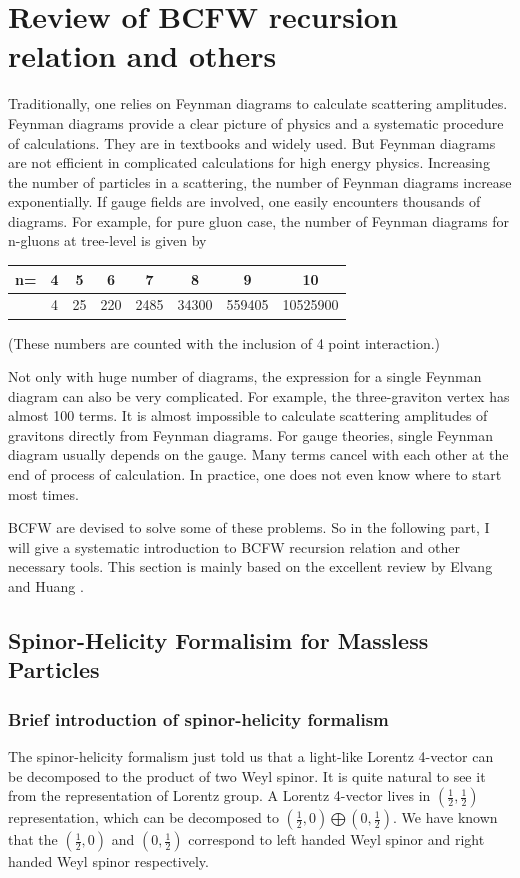\documentclass[12pt]{article}
\numberwithin{equation}{section}
\begin{document}
\section{Review of BCFW recursion relation and others}
Traditionally, one relies on Feynman diagrams to calculate scattering amplitudes. Feynman diagrams
provide a clear picture of physics and a systematic procedure of calculations. They are in textbooks
and widely used. But Feynman diagrams are not efficient in complicated calculations for high energy physics. Increasing
the number of particles in a scattering, the number of Feynman diagrams increase exponentially. If gauge
fields are involved, one easily encounters thousands of diagrams. For example, for pure gluon case, the number
of Feynman diagrams for n-gluons at tree-level is given by
\begin{table}[htbp]
    \centering
\begin{tabular}{|c|c|c|c|c|c|c|c|}
    \hline
    n= & 4 & 5 & 6 & 7 & 8 & 9 & 10 \\
    \hline
       & 4 & 25 & 220 & 2485 & 34300 & 559405 & 10525900   \\
    \hline
    \end{tabular}
\end{table}

\noindent
{
(These numbers are counted with the inclusion of 4 point interaction.)}

Not only with huge number
of diagrams, the expression for a single Feynman diagram can also be very complicated. For example, the
three-graviton vertex has almost 100 terms. It is almost impossible to calculate scattering amplitudes of
gravitons directly from Feynman diagrams. For gauge theories, single Feynman diagram usually depends
on the gauge. Many terms cancel with each other at the end of process of calculation. In practice, one does not
even know where to start most times.

BCFW are devised to solve some of these problems. So in the following part, I will give a systematic introduction to BCFW
recursion relation and other necessary tools. This section is mainly based on the excellent review by Elvang and Huang \cite{Elvang:2013cua}.
\subsection{Spinor-Helicity Formalisim for Massless Particles}
\subsubsection{Brief introduction of spinor-helicity formalism}
The spinor-helicity formalism just told us that a light-like Lorentz 4-vector can be decomposed to the product of 
two Weyl spinor. It is quite natural to see it from the representation of Lorentz group. A Lorentz 4-vector lives in $(\frac{1}{2},\frac{1}{2})$ representation,
which can be decomposed to $(\frac{1}{2},0)\bigoplus (0,\frac{1}{2})$. We have known that the $(\frac{1}{2},0)$ and $(0,\frac{1}{2})$ correspond to left handed Weyl spinor and 
right handed Weyl spinor respectively.
\end{document}
